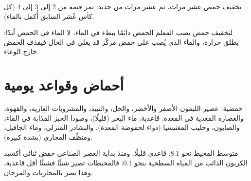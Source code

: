 \begin{omfigure}

{\small تخفيف حمض عشر مرات، ثم عشر مرات من جديد: تمر قيمة  من 2 إلى 3 إلى
4 (كل كأس عُشر  السابق أُكمل بالماء).}
\end{omfigure}

\begin{inthelab}
لتخفيف حمض يصب المعلم الحمض دائمًا ببطء في الماء، لا الماء في الحمض أبدًا:
 يطلق حرارة، والماء الذي يُصب على حمض مركّز قد يغلي في الحال فيقذف
الحمض خارج الوعاء.
\end{inthelab}

\section{أحماض وقواعد يومية}

\begin{proposition}\label{prop:g9:acids-bases-ph:everyday}
حمضية: عصير الليمون الأصفر والأخضر، والخل، والنبيذ، والمشروبات الغازية،
والقهوة، والعصارة المعدية في المعدة. قاعدية: ماء البحر (قليلًا)، وصودا
الخبز المذابة في الماء، والصابون، وحليب المغنيسيا (دواء لحموضة المعدة)،
والنشادر المنزلي، وماء الجافيل، ومنظّف المجاري (بشدة كبيرة).
\end{proposition}

\begin{example}[pH المحيط]\label{ex:g9:acids-bases-ph:ocean}
متوسط  المحيط نحو 8.1: قاعدي قليلًا. ومنذ بداية العصر الصناعي خفض
ثنائي أكسيد الكربون الذائب من   المياه السطحية بنحو 0.1: فالمحيطات
تصير شيئًا فشيئًا أقل قاعدية، وهذا يضر بالمحاريات
والمرجان.
\end{example}

